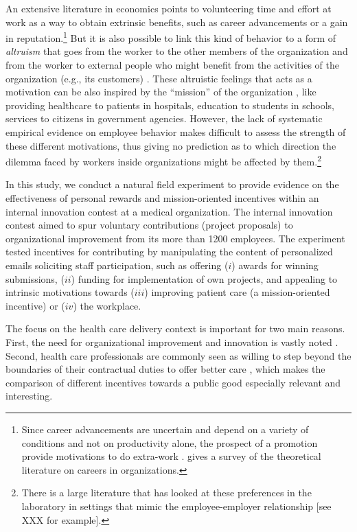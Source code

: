 \documentclass[11pt, titlepage]{article}
\begin{document}
An extensive literature in economics points to volunteering time and
effort at work as a way to obtain extrinsic benefits, such as career
advancements or a gain in reputation.\footnote{Since career advancements
  are uncertain and depend on a variety of conditions and not on
  productivity alone, the prospect of a promotion provide motivations to
  do extra-work \citep{kreps1997intrinsic}. \citet{gibbons1999careers}
  gives a survey of the theoretical literature on careers in
  organizations.} But it is also possible to link this kind of behavior
to a form of \emph{altruism} that goes from the worker to the other
members of the organization
\citep{bandiera2005social, rotemberg2006altruism} and from the worker to
external people who might benefit from the activities of the
organization (e.g., its customers)
\citep{delfgaauw2005dedicated, delfgaauw2008incentives, prendergast2007motivation}.
These altruistic feelings that acts as a motivation can be also inspired
by the ``mission'' of the organization
\citep{akerlof2005identity, besley2005competition}, like providing
healthcare to patients in hospitals, education to students in schools,
services to citizens in government agencies. However, the lack of
systematic empirical evidence on employee behavior makes difficult to
assess the strength of these different motivations, thus giving no
prediction as to which direction the dilemma faced by workers inside
organizations might be affected by them.\footnote{There is a large
  literature that has looked at these preferences in the laboratory in
  settings that mimic the employee-employer relationship {[}see XXX for
  example{]}.}

In this study, we conduct a natural field experiment to provide evidence
on the effectiveness of personal rewards and mission-oriented incentives
within an internal innovation contest at a medical organization. The
internal innovation contest aimed to spur voluntary contributions
(project proposals) to organizational improvement from its more than
1200 employees. The experiment tested incentives for contributing by
manipulating the content of personalized emails soliciting staff
participation, such as offering (\(i\)) awards for winning submissions,
(\(ii\)) funding for implementation of own projects, and appealing to
intrinsic motivations towards (\(iii\)) improving patient care (a
mission-oriented incentive) or (\(iv\)) the workplace.

The focus on the health care delivery context is important for two main
reasons. First, the need for organizational improvement and innovation
is vastly noted \citep{cutler2012reducing}. Second, health care
professionals are commonly seen as willing to step beyond the boundaries
of their contractual duties to offer better care
\citep{delfgaauw2005dedicated}, which makes the comparison of different
incentives towards a public good especially relevant and interesting.
\end{document}
